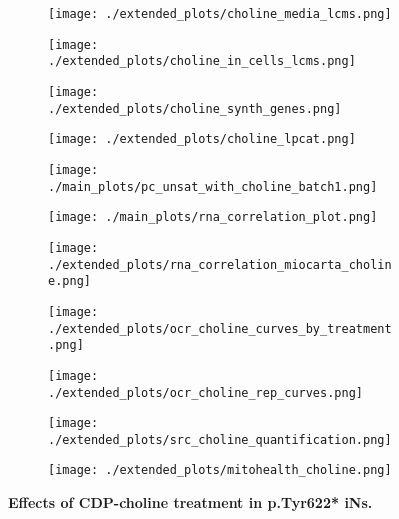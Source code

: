 \begin{figure}[H]
    \begin{subfigure}[t]{.6\textwidth}
        \caption{}
        \texttt{[image: ./extended\_plots/choline\_media\_lcms.png]}        
    \end{subfigure}
    \begin{subfigure}[t]{.4\textwidth}
        \caption{}
        \texttt{[image: ./extended\_plots/choline\_in\_cells\_lcms.png]}        
    \end{subfigure}
    \begin{subfigure}[t]{.2\textwidth}
        \caption{}
        \texttt{[image: ./extended\_plots/choline\_synth\_genes.png]}        
    \end{subfigure}
    \begin{subfigure}[t]{.2\textwidth}
        \caption{}
        \texttt{[image: ./extended\_plots/choline\_lpcat.png]}        
    \end{subfigure}
    \begin{subfigure}[t]{.35\textwidth}
        \caption{}
        \texttt{[image: ./main\_plots/pc\_unsat\_with\_choline\_batch1.png]}        
    \end{subfigure} 
    \begin{subfigure}[t]{0.25\textwidth}
        \caption{}
        \texttt{[image: ./main\_plots/rna\_correlation\_plot.png]}        
    \end{subfigure}  
    \begin{subfigure}[t]{.2\textwidth}
        \caption{}
        \texttt{[image: ./extended\_plots/rna\_correlation\_miocarta\_choline.png]}        
    \end{subfigure}
    \begin{subfigure}[t]{.25\textwidth}
        \caption{}
        \texttt{[image: ./extended\_plots/ocr\_choline\_curves\_by\_treatment.png]}        
    \end{subfigure}
    \begin{subfigure}[t]{.25\textwidth}
        \caption{}
        \texttt{[image: ./extended\_plots/ocr\_choline\_rep\_curves.png]}        
    \end{subfigure}
    \begin{subfigure}[t]{.2\textwidth}
        \caption{}
        \texttt{[image: ./extended\_plots/src\_choline\_quantification.png]}        
    \end{subfigure}
    \begin{subfigure}[t]{.2\textwidth}
        \caption{}
        \texttt{[image: ./extended\_plots/mitohealth\_choline.png]}        
    \end{subfigure}
    \caption{
         \textbf{Effects of CDP-choline treatment in p.Tyr622* iNs.}\\
     }
     \label{fig:choline_treatment}
\end{figure}
